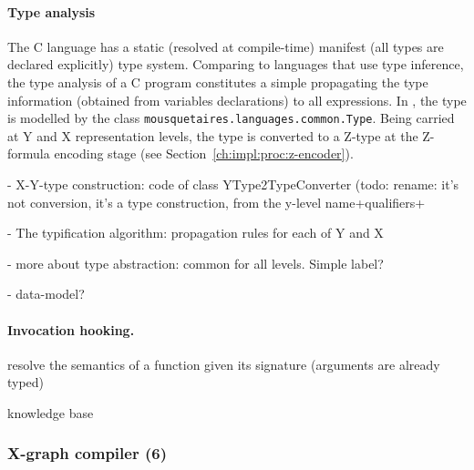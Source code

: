 

\paragraph{Type analysis}%
\label{ch:impl:proc:x-pre-compiler:type}

The C language has a static (resolved at compile-time) manifest (all types are declared explicitly) type system.
Comparing to languages that use type inference, the type analysis of a C program constitutes a simple propagating the type information (obtained from variables declarations) to all expressions.
In \porthos[2], the type is modelled by the class \texttt{mousquetaires.languages.common.Type}.%
Being carried at Y and X representation levels, the type is converted to a Z-type at the Z-formula encoding stage (see Section~\ref{ch:impl:proc:z-encoder}).


- X-Y-type construction: code of class YType2TypeConverter (todo: rename: it's not conversion, it's a type construction, from the y-level name+qualifiers+

- The typification algorithm: propagation rules for each of Y and X

- more about type abstraction: common for all levels. Simple label?

- data-model?

\paragraph{Invocation hooking.}
\label{ch:impl:proc:x-pre-compiler:hooks}

resolve the semantics of a function given its signature (arguments are already typed)

knowledge base

\subsubsection{X-graph compiler (6)}
\label{ch:impl:proc:x-compiler}


